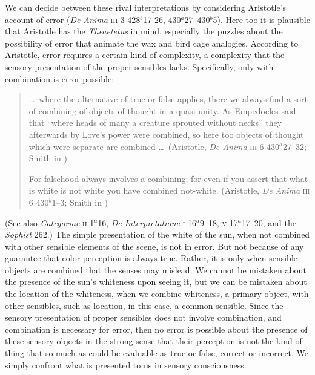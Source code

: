 \documentclass[12pt]{article}
\begin{document}
We can decide between these rival interpretations by considering Aristotle's account of error (\emph{De Anima} \textsc{iii} 3 428\( ^{b} \)17-26, 430\( ^{a} \)27--430\( ^{b} \)5). Here too it is plausible that Aristotle has the \emph{Theaetetus} in mind, especially the puzzles about the possibility of error that animate the wax and bird cage analogies. According to Aristotle, error requires a certain kind of complexity, a complexity that the sensory presentation of the proper sensibles lacks. Specifically, only with combination is error possible:
\begin{quote}
	\ldots\ where the alternative of true or false applies, there we always find a sort of combining of objects of thought in a quasi-unity. As Empedocles said that ``where heads of many a creature sprouted without necks'' they afterwards by Love’s power were combined, so here too objects of thought which were separate are combined \ldots\ (Aristotle, \emph{De Anima} \textsc{iii} 6 430\( ^{a} \)27--32; Smith in \citealt[54]{Barnes:1984uq})
	
	For falsehood always involves a combining; for even if you assert that what is white is not white you have combined not-white. (Aristotle, \emph{De Anima} \textsc{iii} 6 430\( ^{b} \)1--3; Smith in \citealt[54]{Barnes:1984uq})
\end{quote}
(See also \emph{Categoriae} \textsc{ii} 1\( ^{a} \)16, \emph{De Interpretatione} \textsc{i} 16\( ^{a} \)9--18, \textsc{v} 17\( ^{a} \)17--20, and the \emph{Sophist} 262.) The simple presentation of the white of the sun, when not combined with other sensible elements of the scene, is not in error. But not because of any guarantee that color perception is always true. Rather, it is only when sensible objects are combined that the senses may mislead. We cannot be mistaken about the presence of the sun's whiteness upon seeing it, but we can be mistaken about the location of the whiteness, when we combine whiteness, a primary object, with other sensibles, such as location, in this case, a common sensible. Since the sensory presentation of proper sensibles does not involve combination, and combination is necessary for error, then no error is possible about the presence of these sensory objects in the strong sense that their perception is not the kind of thing that so much as could be evaluable as true or false, correct or incorrect. We simply confront what is presented to us in sensory consciousness. 
\end{document}
